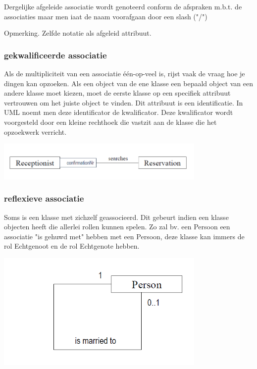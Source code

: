 Dergelijke afgeleide associatie wordt genoteerd conform de afspraken m.b.t. de associaties maar men iaat de naam voorafgaan door een slash ("/")

Opmerking. Zelfde notatie als afgeleid attribuut.

\subsubsection{gekwalificeerde associatie}

Als de multipliciteit van een associatie één-op-veel is, rijst vaak de vraag hoe je dingen kan opzoeken. Als een object van de ene klasse een bepaald object van een andere klasse moet kiezen, moet de eerste klasse op een specifiek attribuut vertrouwen om het juiste object te vinden. Dit attribuut is een identificatie.
In UML noemt men deze identificator de kwalificator. Deze kwalificator wordt voorgesteld door een kleine rechthoek die vastzit aan de klasse die het opzoekwerk verricht.


\begin{center}
\includegraphics[width=4in]{img/qa1}%
\end{center}

\subsubsection{reflexieve associatie}

Soms is een klasse met zichzelf geassocieerd. Dit gebeurt indien een klasse objecten heeft die allerlei rollen kunnen spelen. Zo zal bv. een Persoon een associatie "is gehuwd met" hebben met een Persoon, deze klasse kan immers de rol Echtgenoot en de rol Echtgenote hebben.


\begin{center}
\includegraphics[width=4in]{img/ra1}%
\end{center}

